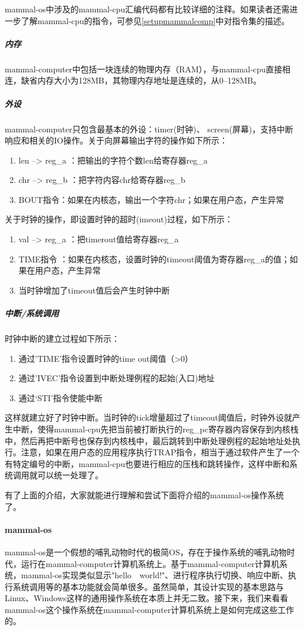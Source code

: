 mammal-os中涉及的mammal-cpu汇编代码都有比较详细的注释。如果读者还需进一步了解mammal-cpu的指令，可参见\ref{setupmammalcomp}中对指令集的描述。

\subparagraph{内存}
mammal-computer中包括一块连续的物理内存（RAM），与mammal-cpu直接相连，缺省内存大小为128MB，其物理内存地址是连续的，从0--128MB。

\subparagraph{外设}

mammal-computer只包含最基本的外设：timer(时钟)、 screen(屏幕)，支持中断响应和相关的IO操作。关于向屏幕输出字符的操作如下所示：
\begin{enumerate}
\item len --> reg\_a ：把输出的字符个数len给寄存器reg\_a
\item chr --> reg\_b   ：把字符内容chr给寄存器reg\_b
\item BOUT指令：如果在内核态，输出一个字符chr；如果在用户态，产生异常
\end{enumerate}

关于时钟的操作，即设置时钟的超时(imeout)过程，如下所示：
\begin{enumerate}
\item val --> reg\_a  ：把timerout值给寄存器reg\_a
\item TIME指令 ：如果在内核态，设置时钟的timeout阈值为寄存器reg\_a的值；如果在用户态，产生异常
\item 当时钟增加了timeout值后会产生时钟中断
\end{enumerate}

\subparagraph{中断/系统调用}

时钟中断的建立过程如下所示：
\begin{enumerate}
\item 通过'TIME'指令设置时钟的time out阈值（>0）
\item 通过'IVEC'指令设置到中断处理例程的起始(入口)地址
\item 通过‘STI’指令使能中断
\end{enumerate}

这样就建立好了时钟中断。当时钟的tick增量超过了timeout阈值后，时钟外设就产生中断，使得mammal-cpu先把当前被打断执行的reg\_pc寄存器内容保存到内核栈中，然后再把中断号也保存到内核栈中，最后跳转到中断处理例程的起始地址处执行。注意，如果在用户态的应用程序执行TRAP指令，相当于通过软件产生了一个有特定编号的中断，mammal-cpu也要进行相应的压栈和跳转操作，这样中断和系统调用就可以统一处理了。

有了上面的介绍，大家就能进行理解和尝试下面将介绍的mammal-os操作系统了。

\paragraph{mammal-os}
mammal-os是一个假想的哺乳动物时代的极简OS，存在于操作系统的哺乳动物时代，运行在mammal-computer计算机系统上。基于mammal-computer计算机系统，mammal-os实现类似显示"hello　world!"、进行程序执行切换、响应中断、执行系统调用等的基本功能就会简单很多。虽然简单，其设计实现的基本思路与Linux、Windows这样的通用操作系统在本质上并无二致。接下来，我们来看看mammal-os这个操作系统在mammal-computer计算机系统上是如何完成这些工作的。

